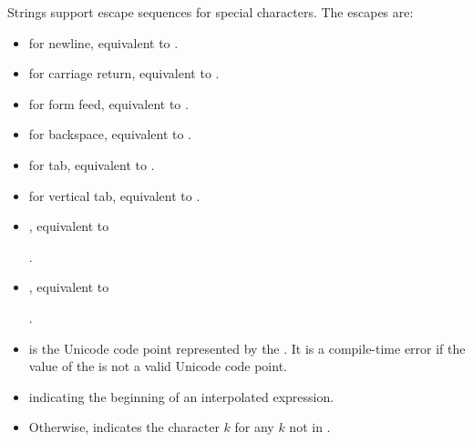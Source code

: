 \documentclass[makeidx]{article}
\begin{document}
{\LMHash{}%
Strings support escape sequences for special characters.
The escapes are:
\begin{itemize}
\item
   for newline, equivalent to .
\item
   for carriage return, equivalent to .
\item
   for form feed, equivalent to .
\item
   for backspace, equivalent to .
\item
   for tab, equivalent to .
\item
   for vertical tab, equivalent to .
\item
  , equivalent to

  .
\item
  ,
  equivalent to

  \noindent
  .
\item
   is
  the Unicode code point represented by the
  .
  It is a compile-time error if the value of the
  is not a valid Unicode code point.
\item
  \lit{\$} indicating the beginning of an interpolated expression.
\item
  Otherwise,  indicates the character $k$ for
  any $k$ not in .
\end{itemize}

}
\end{document}
